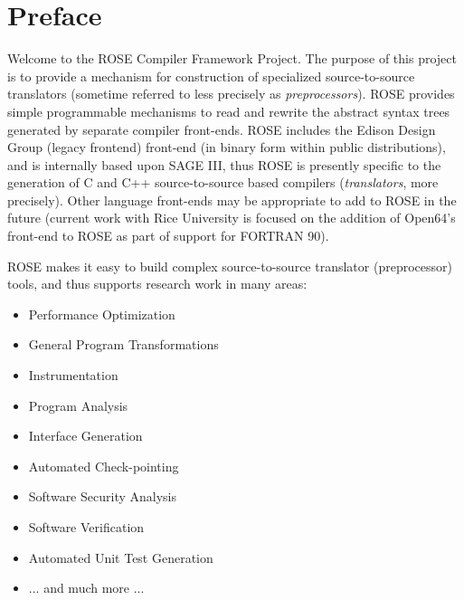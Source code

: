 
\chapter*{Preface}


   Welcome to the ROSE Compiler Framework Project.  The purpose of this project is to 
provide a mechanism for construction of specialized source-to-source translators 
(sometime referred to less precisely as {\em preprocessors}).  ROSE provides 
simple programmable mechanisms to read and rewrite the abstract syntax trees generated 
by separate compiler front-ends.  ROSE includes the Edison Design Group (legacy frontend) 
front-end (in binary form within public
distributions), and is internally based upon SAGE III, thus ROSE is presently specific 
to the generation of C and C++ source-to-source based compilers ({\em translators}, 
more precisely).  Other language front-ends may be appropriate to add to ROSE in 
the future (current work with Rice University is focused on the addition of Open64's
front-end to ROSE as part of support for FORTRAN 90).

   ROSE makes it easy to build complex source-to-source translator
(preprocessor) tools, and thus supports research work in many areas:
\begin{itemize}
   \item Performance Optimization
   \item General Program Transformations
   \item Instrumentation
   \item Program Analysis
   \item Interface Generation
   \item Automated Check-pointing
   \item Software Security Analysis
   \item Software Verification
   \item Automated Unit Test Generation
   \item ... and much more ...
\end{itemize}

